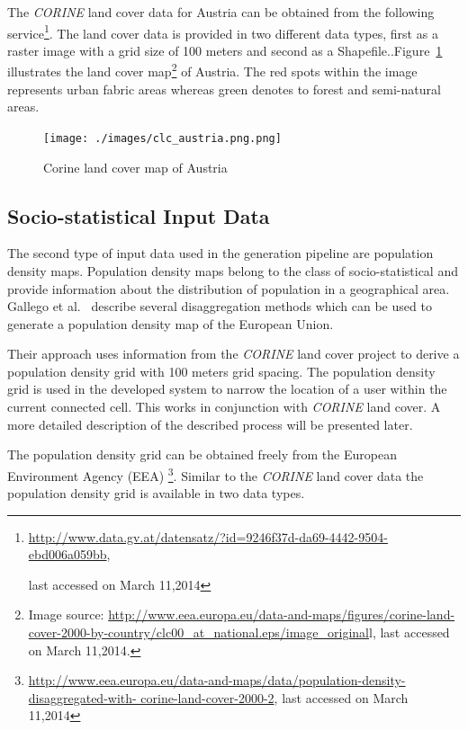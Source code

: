 \documentclass[master,english]{hgbthesis}
\begin{document}
The \emph{CORINE} land cover data for Austria can be obtained from the following service\footnote{\url{http://www.data.gv.at/datensatz/?id=9246f37d-da69-4442-9504-ebd006a059bb},

	last accessed on March 11,2014}. The land cover data is provided in two different data types, first as a raster image with a grid size of 100 meters and second as a Shapefile..Figure~\ref{fig:clc_austria} illustrates the land cover map\footnote{Image source: \url{http://www.eea.europa.eu/data-and-maps/figures/corine-land-cover-2000-by-country/clc00_at_national.eps/image_original}l, last accessed on March 11,2014.} of Austria. The red spots within the image represents urban fabric areas whereas green denotes to forest and semi-natural areas.

\begin{figure}

	\centering

	\texttt{[image: ./images/clc\_austria.png.png]}

	\caption{Corine land cover map of Austria}

	\label{fig:clc_austria}

\end{figure}

\subsection{Socio-statistical Input Data}

The second type of input data used in the generation pipeline are population density maps. Population density maps belong to the class of socio-statistical and provide information about the distribution of population in a geographical area. Gallego et al.\ \cite{Gallego2010,Gallego2011} describe several disaggregation methods which can be used to generate a population density map of the European Union.

Their approach uses information from the \emph{CORINE} land cover project to derive a population density grid with 100 meters grid spacing. The population density grid is used in the developed system to narrow the location of a user within the current connected cell. This works in conjunction with \emph{CORINE} land cover. A more detailed description of the described process will be presented later.

The population density grid can be obtained freely from the European Environment Agency (EEA) \footnote{\url{http://www.eea.europa.eu/data-and-maps/data/population-density-disaggregated-with-

	corine-land-cover-2000-2}, last accessed on March 11,2014}. Similar to the \emph{CORINE} land cover data the population density grid is available in two data types.
\end{document}
